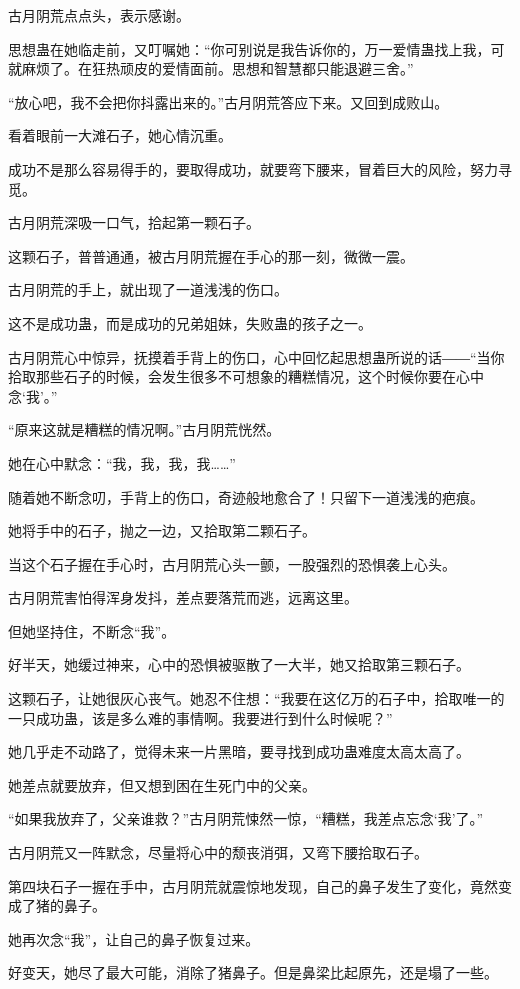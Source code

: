 \begin{this_body}
古月阴荒点点头，表示感谢。

思想蛊在她临走前，又叮嘱她：“你可别说是我告诉你的，万一爱情蛊找上我，可就麻烦了。在狂热顽皮的爱情面前。思想和智慧都只能退避三舍。”

“放心吧，我不会把你抖露出来的。”古月阴荒答应下来。又回到成败山。

看着眼前一大滩石子，她心情沉重。

成功不是那么容易得手的，要取得成功，就要弯下腰来，冒着巨大的风险，努力寻觅。

古月阴荒深吸一口气，拾起第一颗石子。

这颗石子，普普通通，被古月阴荒握在手心的那一刻，微微一震。

古月阴荒的手上，就出现了一道浅浅的伤口。

这不是成功蛊，而是成功的兄弟姐妹，失败蛊的孩子之一。

古月阴荒心中惊异，抚摸着手背上的伤口，心中回忆起思想蛊所说的话――“当你拾取那些石子的时候，会发生很多不可想象的糟糕情况，这个时候你要在心中念‘我’。”

“原来这就是糟糕的情况啊。”古月阴荒恍然。

她在心中默念：“我，我，我，我……”

随着她不断念叨，手背上的伤口，奇迹般地愈合了！只留下一道浅浅的疤痕。

她将手中的石子，抛之一边，又拾取第二颗石子。

当这个石子握在手心时，古月阴荒心头一颤，一股强烈的恐惧袭上心头。

古月阴荒害怕得浑身发抖，差点要落荒而逃，远离这里。

但她坚持住，不断念“我”。

好半天，她缓过神来，心中的恐惧被驱散了一大半，她又拾取第三颗石子。

这颗石子，让她很灰心丧气。她忍不住想：“我要在这亿万的石子中，拾取唯一的一只成功蛊，该是多么难的事情啊。我要进行到什么时候呢？”

她几乎走不动路了，觉得未来一片黑暗，要寻找到成功蛊难度太高太高了。

她差点就要放弃，但又想到困在生死门中的父亲。

“如果我放弃了，父亲谁救？”古月阴荒悚然一惊，“糟糕，我差点忘念‘我’了。”

古月阴荒又一阵默念，尽量将心中的颓丧消弭，又弯下腰拾取石子。

第四块石子一握在手中，古月阴荒就震惊地发现，自己的鼻子发生了变化，竟然变成了猪的鼻子。

她再次念“我”，让自己的鼻子恢复过来。

好变天，她尽了最大可能，消除了猪鼻子。但是鼻梁比起原先，还是塌了一些。


\end{this_body}
